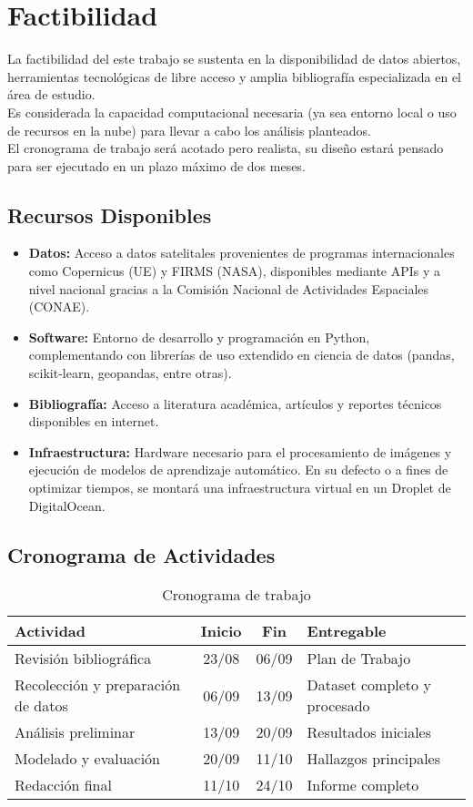 \section{Factibilidad}
La factibilidad del este trabajo se sustenta en la disponibilidad de datos abiertos, herramientas tecnológicas de libre acceso y amplia bibliografía especializada en el área de estudio. \\ 

Es considerada la capacidad computacional necesaria (ya sea entorno local o uso de recursos en la nube) para llevar a cabo los análisis planteados. \\

El cronograma de trabajo será acotado pero realista, su diseño estará pensado para ser ejecutado en un plazo máximo de dos meses.

\subsection{Recursos Disponibles}
\begin{itemize}
    \item \textbf{Datos:} Acceso a datos satelitales provenientes de programas internacionales como Copernicus (UE) y FIRMS (NASA), disponibles mediante APIs y a nivel nacional gracias a la Comisión Nacional de Actividades Espaciales (CONAE).
    \item \textbf{Software:} Entorno de desarrollo y programación en Python, complementando con librerías de uso extendido en ciencia de datos (pandas, scikit-learn, geopandas, entre otras).
    \item \textbf{Bibliografía:} Acceso a literatura académica, artículos y reportes técnicos disponibles en internet.
    \item \textbf{Infraestructura:} Hardware necesario para el procesamiento de imágenes y ejecución de modelos de aprendizaje automático. En su defecto o a fines de optimizar tiempos, se montará una infraestructura virtual en un Droplet de DigitalOcean.
\end{itemize}

\subsection{Cronograma de Actividades}
\begin{table}[h]
\centering
\begin{tabular}{lccl}
\toprule
\textbf{Actividad} & \textbf{Inicio} & \textbf{Fin} & \textbf{Entregable} \\
\midrule
Revisión bibliográfica & 23/08 & 06/09 & Plan de Trabajo \\
Recolección y preparación de datos & 06/09 & 13/09 & Dataset completo y procesado \\
Análisis preliminar & 13/09 & 20/09 & Resultados iniciales \\
Modelado y evaluación & 20/09 & 11/10 & Hallazgos principales \\
Redacción final & 11/10 & 24/10 & Informe completo \\
\bottomrule
\end{tabular}
\caption{Cronograma de trabajo}
\end{table}

